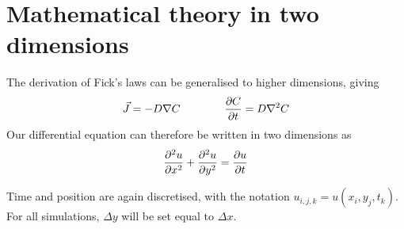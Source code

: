 \section{Mathematical theory in two dimensions}
The derivation of Fick's laws can be generalised to higher dimensions, giving
\[
    \vec{J} = -D\nabla C \qquad\qquad \pdv{C}{t} = D\nabla^2C
\]
Our differential equation can therefore be written in two dimensions as
\begin{equation} \label{eq:twoDim}
\pdv[2]{u}{x} + \pdv[2]{u}{y} = \pdv{u}{t}
\end{equation}

Time and position are again discretised, with the notation \(u_{i,j,k} = u(x_i,y_j,t_k)\). For all simulations, \(\Delta y\) will be set equal to \(\Delta x\).





\clearpage


\clearpage


\clearpage


\clearpage

\clearpage
{}
\nocite{tveito2004introduction}
\nocite{compphys}
\printbibliography
\newpage





